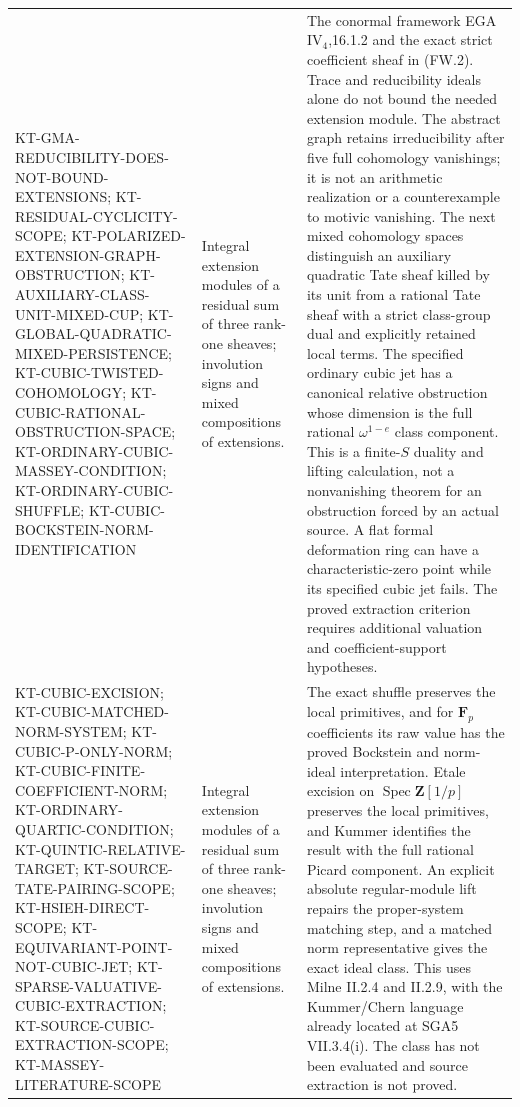 \begin{longtable}{>{\raggedright\arraybackslash}p{}
>{\raggedright\arraybackslash}p{}
>{\raggedright\arraybackslash}p{}}
KT-GMA-REDUCIBILITY-DOES-NOT-BOUND-EXTENSIONS;
KT-RESIDUAL-CYCLICITY-SCOPE;
KT-POLARIZED-EXTENSION-GRAPH-OBSTRUCTION;
KT-AUXILIARY-CLASS-UNIT-MIXED-CUP;
KT-GLOBAL-QUADRATIC-MIXED-PERSISTENCE;
KT-CUBIC-TWISTED-COHOMOLOGY;
KT-CUBIC-RATIONAL-OBSTRUCTION-SPACE;
KT-ORDINARY-CUBIC-MASSEY-CONDITION;
KT-ORDINARY-CUBIC-SHUFFLE;
KT-CUBIC-BOCKSTEIN-NORM-IDENTIFICATION &
Integral extension modules of a residual sum of three
rank-one sheaves; involution signs and mixed compositions
of extensions. &
The conormal framework EGA IV$_4$,16.1.2 and the exact
strict coefficient sheaf in (FW.2). Trace and reducibility
ideals alone do not bound the needed extension module.
The abstract graph retains irreducibility after five full
cohomology vanishings; it is not an arithmetic realization
or a counterexample to motivic vanishing. The next mixed
cohomology spaces distinguish an auxiliary quadratic Tate
sheaf killed by its unit from a rational Tate sheaf with
a strict class-group dual and explicitly retained local terms.
The specified ordinary cubic jet has a canonical relative
obstruction whose dimension is the full rational
$\omega^{1-e}$ class component. This is a finite-$S$
duality and lifting calculation, not a nonvanishing theorem
for an obstruction forced by an actual source. A flat formal
deformation ring can have a characteristic-zero point while
its specified cubic jet fails. The proved extraction criterion
requires additional valuation and coefficient-support hypotheses.\\
KT-CUBIC-EXCISION; KT-CUBIC-MATCHED-NORM-SYSTEM;
KT-CUBIC-P-ONLY-NORM;
KT-CUBIC-FINITE-COEFFICIENT-NORM;
KT-ORDINARY-QUARTIC-CONDITION; KT-QUINTIC-RELATIVE-TARGET;
KT-SOURCE-TATE-PAIRING-SCOPE;
KT-HSIEH-DIRECT-SCOPE;
KT-EQUIVARIANT-POINT-NOT-CUBIC-JET;
KT-SPARSE-VALUATIVE-CUBIC-EXTRACTION;
KT-SOURCE-CUBIC-EXTRACTION-SCOPE;
KT-MASSEY-LITERATURE-SCOPE &
Integral extension modules of a residual sum of three
rank-one sheaves; involution signs and mixed compositions
of extensions. &
The exact shuffle preserves the local primitives, and for
$\mathbf F_p$ coefficients its raw value has the proved
Bockstein and norm-ideal interpretation. Etale excision on
$\operatorname{Spec}\mathbf Z[1/p]$ preserves the local primitives,
and Kummer identifies the result with the full rational Picard
component. An explicit absolute regular-module lift repairs the
proper-system matching step, and a matched norm representative
gives the exact ideal class. This uses Milne II.2.4 and II.2.9,
with the Kummer/Chern language already located at SGA5 VII.3.4(i).
The class has not been evaluated and source extraction is not proved.

\end{longtable}
